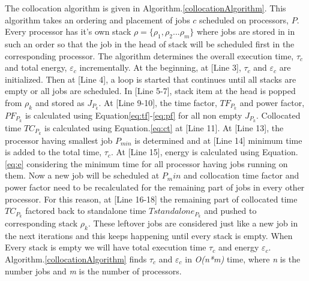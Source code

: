 The collocation algorithm is given in Algorithm.\ref{collocationAlgorithm}. This algorithm takes an ordering and placement of 
jobs $c$ scheduled on processors, $P$. Every processor has it's own stack $\rho = \{\rho_1, \rho_2 ... \rho_m\}$ where jobs are stored in
in such an order so that the job in the head of stack will be scheduled first in the corresponding processor.
The algorithm determines the overall execution time, $\tau_c$ and total energy, $\varepsilon_c$ incrementally. At the beginning,
at [Line 3],
$\tau_c$ and $\varepsilon_c$ are initialized. Then at [Line 4], a loop is started that continues until all stacks are empty or 
all jobs are scheduled. In [Line 5-7], stack item at the head is popped from $\rho_k$ and stored as $J_{P_k}$. At [Line 9-10], 
the time factor,
$TF_{P_k}$ and power factor, $PF_{P_k}$ is calculated using Equation\ref{eq:tf}-\ref{eq:pf} for all non empty $J_{P_k}$. Collocated
time $TC_{P_k}$ is calculated using Equation.\ref{eq:ct} at [Line 11]. At [Line 13], the processor having smallest job ${P_{min}}$
is determined and at [Line 14] minimum time is added to the total time, $\tau_c$. At [Line 15], energy is calculated using
Equation.\ref{eq:e} considering the minimum time for all processor having jobs running on them. Now a new job will be scheduled at
$P_min$ and collocation time factor and power factor need to be recalculated for the remaining part of jobs in every other
processor. For this reason, at [Line 16-18] the remaining part of collocated time ${TC_{P_k}}$ factored back to
standalone time $Tstandalone_{P_k}$ and pushed to corresponding stack $\rho_k$. These leftover jobs are considered just like a new
job in the next iterations and this keeps happening until every stack is empty. When Every stack is empty we will have total
execution time $\tau_c$ and energy $\varepsilon_c$. Algorithm.\ref{collocationAlgorithm} finds $\tau_c$ and $\varepsilon_c$
in \emph{O(n*m)} time, where \emph{n} is the number jobs and \emph{m} is the number of processors.

